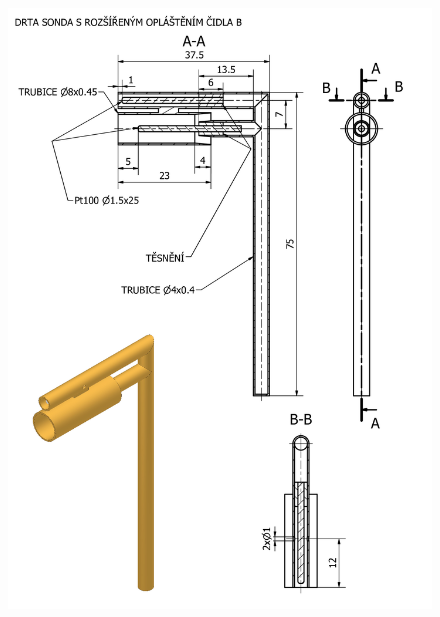     \begin{figure}[ht!]
        \centering
        \includegraphics[width=\textwidth]{400_SIMULACE_KONSTRUKCNICH_UPRAV/Vykresy_rendery/Sonda_s_rozsirenym_stinenim_B_vykres.png}
        
    \end{figure}
    \newpage
{} \label{fig:prumer-stineni-B-vykres}
